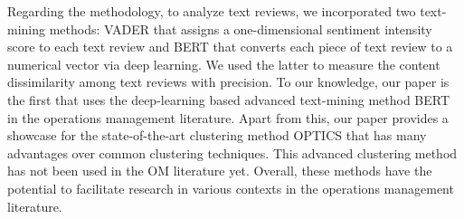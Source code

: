 \documentclass[msom,blindrev]{informs3}
\def\bibsep{\smallskipamount}%
\begin{document}
Regarding the methodology, to analyze text reviews, we incorporated two text-mining methods: VADER that assigns a one-dimensional sentiment intensity score to each text review  and BERT that converts each piece of text review to a numerical vector via deep learning. We used the latter to measure the content dissimilarity among text reviews with precision. To our knowledge, our paper is the first that uses the deep-learning based advanced text-mining method BERT in the operations management literature.  Apart from this, our paper provides a showcase for the state-of-the-art clustering method OPTICS that has many advantages over common clustering techniques. This advanced clustering method has not been used in the OM literature yet. Overall, these methods have the potential to facilitate research in various contexts in the operations management literature.
	

{
\SingleSpacedXI
}	


\ECSwitch


\vspace{-10pt}
%
\end{document}

